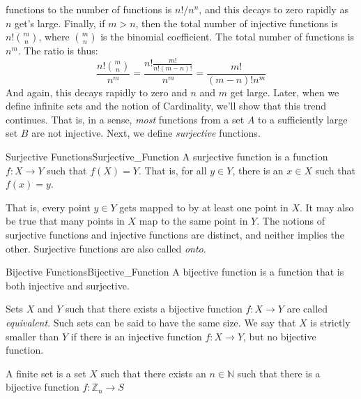             functions to the number of functions is
            $n!/n^{n}$, and this decays to zero rapidly as
            $n$ get's large. Finally, if $m>n$, then the total
            number of injective functions is
            $n!\binom{m}{n}$, where $\binom{m}{n}$ is the
            binomial coefficient. The total number of functions
            is $n^{m}$. The ratio is thus:
            \begin{equation}
                \frac{n!\binom{m}{n}}{n^{m}}=\frac{n!\frac{m!}{n!(m-n)!}}{n^{m}}
                                            =\frac{m!}{(m-n)!n^{m}}
            \end{equation}
            And again, this decays rapidly to zero and $n$ and $m$
            get large. Later, when we define infinite sets
            and the notion of Cardinality, we'll show that this
            trend continues. That is, in a sense, \textit{most}
            functions from a set $A$ to a sufficiently large set
            $B$ are not injective. Next, we define
            \textit{surjective} functions.
            \begin{ldefinition}{Surjective Functions}{Surjective_Function}
                A \gls{surjective function} is a function
                $f:X\rightarrow{Y}$ such that $f(X)=Y$.
                That is, for all $y\in{Y}$, there is an
                $x\in{X}$ such that $f(x)=y$.
            \end{ldefinition}
            That is, every point $y\in{Y}$ gets mapped to by
            at least one point in $X$. It may also be true that
            many points in $X$ map to the same point in $Y$.
            The notions of surjective functions and injective
            functions are distinct, and neither implies the
            other. Surjective functions are also called
            \textit{onto}.
            \begin{ldefinition}{Bijective Functions}{Bijective_Function}
                A \gls{bijective function} is a function
                that is both injective and surjective.
            \end{ldefinition}
            Sets $X$ and $Y$ such that there exists a bijective function
            $f:X\rightarrow{Y}$ are called \textit{equivalent}. Such sets can
            be said to have the same size. We say that $X$ is strictly
            smaller than $Y$ if there is an injective function
            $f:X\rightarrow{Y}$, but no bijective function.
            \begin{definition}
                A finite set is a set $X$ such that there exists an
                $n\in\mathbb{N}$ such that there is a bijective function
                $f:\mathbb{Z}_{n}\rightarrow{S}$
            \end{definition}
